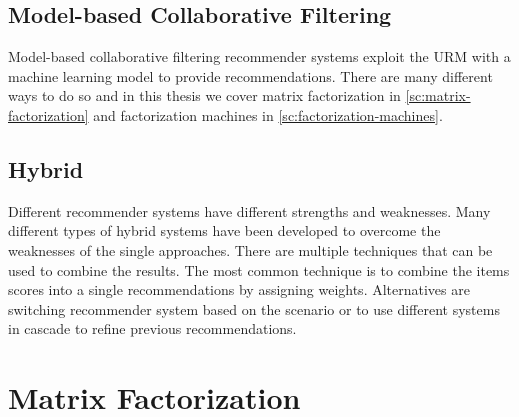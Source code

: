 \subsection{Model-based Collaborative Filtering}

Model-based collaborative filtering recommender systems exploit the URM with a machine learning model to provide recommendations. There are many different ways to do so and in this thesis we cover matrix factorization in \autoref{sc:matrix-factorization} and factorization machines in \autoref{sc:factorization-machines}.


\subsection{Hybrid}

Different recommender systems have different strengths and weaknesses. Many different types of hybrid systems have been developed to overcome the weaknesses of the single approaches. There are multiple techniques that can be used to combine the results. The most common technique is to combine the items scores into a single recommendations by assigning weights. Alternatives are switching recommender system based on the scenario or to use different systems in cascade to refine previous recommendations.



\section{Matrix Factorization}
\label{sc:matrix-factorization}

